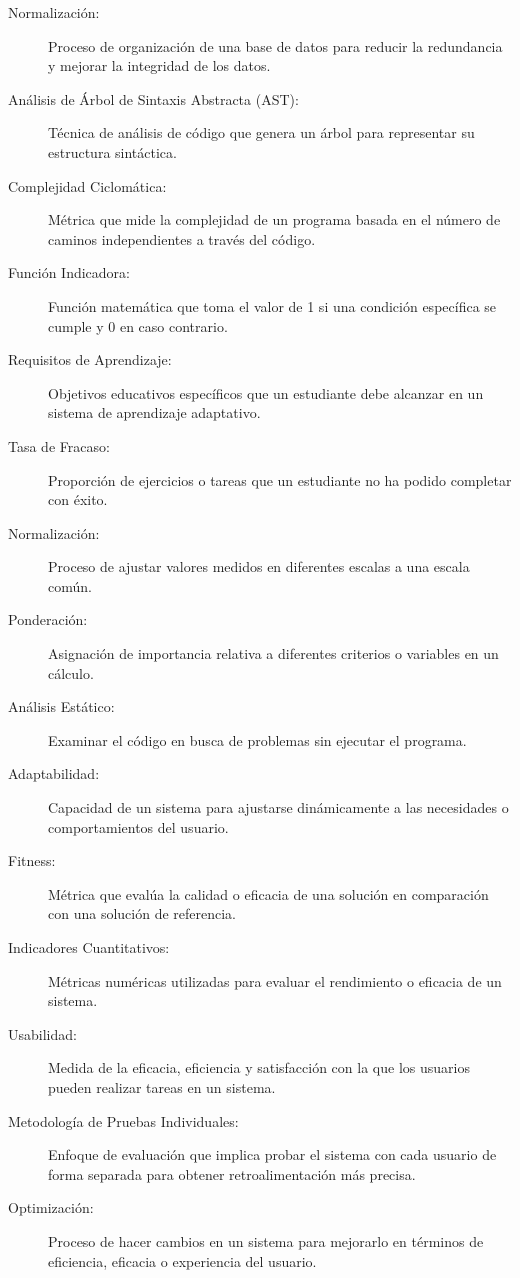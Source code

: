 \begin{description}
    \item[Normalización:] Proceso de organización de una base de datos para reducir la redundancia y mejorar la integridad de los datos.
    \item[Análisis de Árbol de Sintaxis Abstracta (AST):] Técnica de análisis de código que genera un árbol para representar su estructura sintáctica.
    \item[Complejidad Ciclomática:] Métrica que mide la complejidad de un programa basada en el número de caminos independientes a través del código.
    \item[Función Indicadora:] Función matemática que toma el valor de 1 si una condición específica se cumple y 0 en caso contrario.
    \item[Requisitos de Aprendizaje:] Objetivos educativos específicos que un estudiante debe alcanzar en un sistema de aprendizaje adaptativo.
    \item[Tasa de Fracaso:] Proporción de ejercicios o tareas que un estudiante no ha podido completar con éxito.
    \item[Normalización:] Proceso de ajustar valores medidos en diferentes escalas a una escala común.
    \item[Ponderación:] Asignación de importancia relativa a diferentes criterios o variables en un cálculo.
    \item[Análisis Estático:] Examinar el código en busca de problemas sin ejecutar el programa.
    \item[Adaptabilidad:] Capacidad de un sistema para ajustarse dinámicamente a las necesidades o comportamientos del usuario.
    \item[Fitness:] Métrica que evalúa la calidad o eficacia de una solución en comparación con una solución de referencia.
    \item[Indicadores Cuantitativos:] Métricas numéricas utilizadas para evaluar el rendimiento o eficacia de un sistema.
    \item[Usabilidad:] Medida de la eficacia, eficiencia y satisfacción con la que los usuarios pueden realizar tareas en un sistema.
    \item[Metodología de Pruebas Individuales:] Enfoque de evaluación que implica probar el sistema con cada usuario de forma separada para obtener retroalimentación más precisa.
    \item[Optimización:] Proceso de hacer cambios en un sistema para mejorarlo en términos de eficiencia, eficacia o experiencia del usuario.
\end{description}

